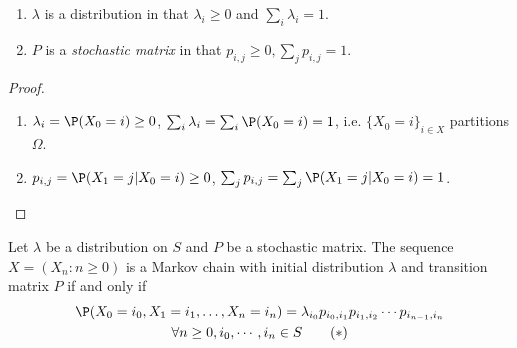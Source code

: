 \documentclass[a4paper]{article}
\begin{document}
\begin{prop}\leavevmode
  \begin{enumerate}
  \item $\lambda$ is a distribution in that $\lambda_i\geq 0$ and $\sum_i \lambda_i = 1$.
  \item $P$ is a \emph{stochastic matrix} in that $p_{i,j} \geq 0, \sum_j p_{i,j} = 1$.
  \end{enumerate}
\end{prop}

\begin{proof}
  \begin{enumerate}
  \item $\lambda_i = \P(X_0=i) \geq 0$, $\sum_i \lambda_i = \sum_i\P(X_0=i)=1$, i.e. $\{X_0=i\}_{i\in X}$ partitions $\Omega$.
  \item $p_{i,j} = \P(X_1=j|X_0=i) \geq 0$, $\sum_j p_{i,j} = \sum_j \P(X_1=j|X_0=i) = 1$.
  \end{enumerate}
\end{proof}

\begin{thm}
  Let $\lambda$ be a distribution on $S$ and $P$ be a stochastic matrix. The sequence $X=(X_n:n \geq 0)$ is a Markov chain with initial distribution $\lambda$ and transition matrix $P$ if and only if
  \begin{multline}\label{eqn:joint probability}
    \P(X_0=i_0, X_1=i_1, \ldots, X_n=i_n) = \lambda_{i_0} p_{i_0,i_1} p_{i_1,i_2} \cdots p_{i_{n-1}, i_n} \\
    \forall n\geq 0, i_0,\cdots, i_n \in S \tag{$\ast$}
  \end{multline}
    
\end{thm}
\end{document}
